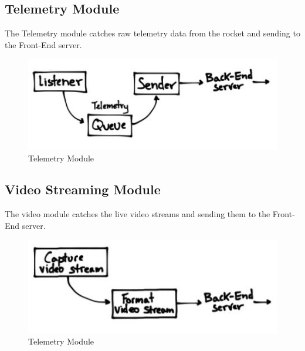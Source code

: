 \newpage

\subsection{Telemetry Module}
The Telemetry module catches raw telemetry data from the rocket and sending to the Front-End server.

\begin{figure}[!ht]
  \centering
  \includegraphics[scale=.8]{imgs/telemetry-detailed.jpg}
  \caption{Telemetry Module}
\end{figure}

\subsection{Video Streaming Module}
The video module catches the live video streams and sending them to the Front-End server.

\begin{figure}[!ht]
  \centering
  \includegraphics[scale=.8]{imgs/video-detailed.jpg}
  \caption{Telemetry Module}
\end{figure}

